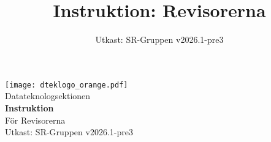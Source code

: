 \documentclass[a4paper]{dtek}
\title{Instruktion: Revisorerna}
\date{Utkast: SR-Gruppen v2026.1-pre3}
\begin{document}
\begin{titlepage}
  \thispagestyle{empty} %
  \vspace*{\fill}
  \begin{center}
    \texttt{[image: dteklogo\_orange.pdf]}\\[3em]
    {\Huge Datateknologsektionen}\\[3em]
    {\Huge \textbf{Instruktion}}\\[1em]
    {\Huge För Revisorerna}\\[3em]
    Utkast: SR-Gruppen v2026.1-pre3\\[20em]
  \end{center}
  \vspace*{\fill}
\end{titlepage}

\makeheadfoot

\setcounter{tocdepth}{2}
\tableofcontents
\end{document}
